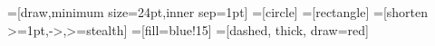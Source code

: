 
\newcommand{\blue}[1] {%
	\protect\leavevmode%
  \begingroup%
	\color{blue}%
    #1%
	\endgroup%
}
\newcommand{\red}[1] {%
	\protect\leavevmode%
  \begingroup%
	\color{red}%
    #1%
	\endgroup%
}
\newcommand{\green}[1] {%
	\protect\leavevmode%
  \begingroup%
	\color{Green}%
    #1%
	\endgroup%
}
\newcommand{\gray}[1] {%
	\protect\leavevmode%
  \begingroup%
	\color{Gray}%
    #1%
	\endgroup%
}
\newcommand{\orange}[1] {%
	\protect\leavevmode%
  \begingroup%
	\color{orange!70!black}%
    #1%
	\endgroup%
}

\newcommand*{\trail}{\tau}     %
\newcommand*{\q}{\omega}       %
\newcommand*{\p}{\pi}          %
\newcommand*{\wl}{\mathrm{WL}} %
\newcommand*{\reason}{\rho}    %
\newcommand*{\level}{\delta}   %

=[draw,minimum size=24pt,inner sep=1pt]
=[circle]
=[rectangle]
=[shorten >=1pt,->,>=stealth]
=[fill=blue!15]
=[dashed, thick, draw=red]
